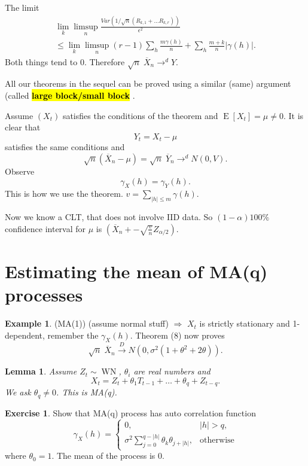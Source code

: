 \documentclass[12pt,a4paper, notitlepage]{book}
\newcommand{\hlc}[2][yellow]{ {\sethlcolor{#1} \hl{#2}} }
\newcommand{\hlcr}[1]{\hlc[lightred]{#1}}
\theoremstyle{definition} %
\newtheorem{example}{Example}[chapter]
\newtheorem{exercise}{Exercise}[chapter]
\theoremstyle{plain} %
\newtheorem{definition}{Lemma}[chapter]
\DeclareMathOperator{\E}{E}
\DeclareMathOperator{\Wn}{WN}
\newcommand{\New}[1]{ {\bf \hlcr{#1} } }
\begin{document}
The limit
\begin{align*} \lim_k \limsup_n \frac{Var(1/\sqrt{n}(R_{k,1} + \dots R_{k,r}))}{\epsilon^2} \\
 \leq \lim_k \limsup_n (r-1) \sum_h \frac{m \gamma(h)}{n} + \sum_h \frac{m+k}{n}|\gamma(h)|.
\end{align*}
 Both things tend to $0$. Therefore $\sqrt{n}\; \overline{X}_n \rightarrow^d Y$. 
\endproof


All our theorems in the sequel can be proved using a similar (same) argument (called \New{ large block/small block}.

Assume $(X_t)$ satisfies the conditions of the theorem and $\E[ X_t] = \mu \neq 0$. It is clear that 
\[ Y_t = X_t - \mu \] 
satisfies the same conditions and 
\[ \sqrt{n} (\overline{X}_n - \mu) = \sqrt{n}\; \overline{Y}_n \rightarrow^d N(0,V). \]
 Observe 
\[ \gamma_X(h) = \gamma_Y(h). \]
 This is how we use the theorem. $v = \sum_{|h| \leq m} \gamma(h)$.


Now we know a CLT, that does not involve IID data. So $(1 - \alpha) 100 \%$ confidence interval for $\mu$ is 
$(\overline{X}_n +- \sqrt{\frac{v}{n}}Z_{\alpha/2})$. 

\section{Estimating the mean of MA(q) processes}

\begin{example} (MA(1))
(assume normal stuff) $\Rightarrow$ $ X_t$ is strictly stationary and 1-dependent, remember the $\gamma_X(h)$. Theorem 
(8) now proves 
\[ \sqrt{n} \; \overline{X}_n \overset{D}{ \rightarrow} N(0, \sigma^2 (1 + \theta^2 + 2\theta)) . \]
\end{example}

\begin{definition}
Assume $Z_t \sim \Wn$, $\theta_i$ are real numbers and 
\[ X_t = Z_t + \theta_1 T_{t-1} + \dots + \theta_q + Z_{t-q}. \]
 We ask $\theta_q \neq 0$. This is MA(q).
\end{definition}

\begin{exercise}
Show that MA(q) process has auto correlation function 
\[ \gamma_X(h) = \begin{cases} 0 , & |h| > q , \\ \sigma^2 \sum_{j = 0}^{q - |h|}\theta_k \theta_{j + |h|} , & \text{otherwise} \end{cases} \]
 where $\theta_0 = 1$. The mean of the process is $0$.
\end{exercise}
\end{document}
